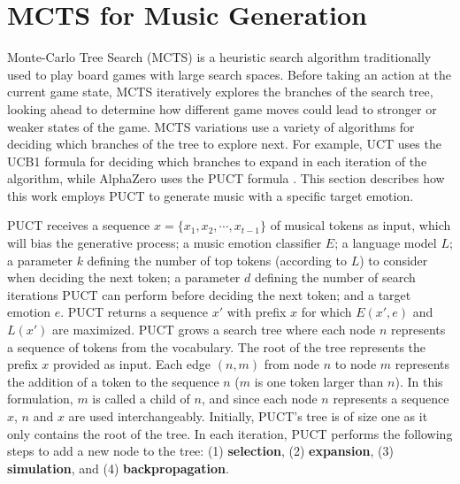 
\section{MCTS for Music Generation}
\label{sec:puct}

Monte-Carlo Tree Search (MCTS) is a heuristic search algorithm traditionally used to play board games with large search spaces. Before taking an action at the current game state, MCTS iteratively explores the branches of the search tree, looking ahead to determine how different game moves could lead to stronger or weaker states of the game. MCTS variations use a variety of algorithms for deciding which branches of the tree to explore next. For example, UCT \cite{Kocsis2006} uses the UCB1 formula for deciding which branches to expand in each iteration of the algorithm, while AlphaZero uses the PUCT formula \cite{silver2017mastering}. This section describes how this work employs PUCT to generate music with a specific target emotion.

PUCT receives a sequence $x = \{x_1, x_2, \cdots, x_{t-1}\}$ of musical tokens as input, which will bias the generative process; a music emotion classifier $E$; a language model $L$; a parameter $k$ defining the number of top tokens (according to $L$) to consider when deciding the next token; a parameter $d$ defining the number of search iterations PUCT can perform before deciding the next token; and a target emotion $e$. PUCT returns a sequence $x'$ with prefix $x$ for which $E(x', e)$ and $L(x')$ are maximized. PUCT grows a search tree where each node $n$ represents a sequence of tokens from the vocabulary. The root of the tree represents the prefix $x$ provided as input. Each edge $(n, m)$ from node $n$ to node $m$ represents the addition of a token to the sequence $n$ ($m$ is one token larger than $n$). In this formulation, $m$ is called a child of $n$, and since each node $n$ represents a sequence $x$, $n$ and $x$ are used interchangeably. Initially, PUCT's tree is of size one as it only contains the root of the tree. In each iteration, PUCT performs the following steps to add a new node to the tree: (1) \textbf{selection}, (2) \textbf{expansion}, (3) \textbf{simulation}, and (4) \textbf{backpropagation}.

